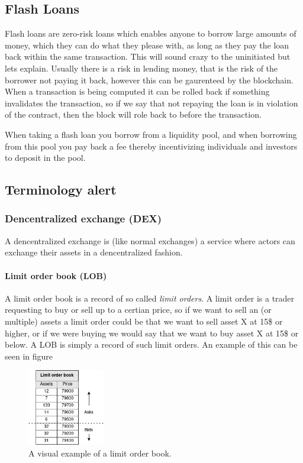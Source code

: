\subsection{Flash Loans}
Flash loans are zero-risk loans which enables anyone to borrow large amounts of money, which they can do what they please with, as long as they pay the loan back within the same transaction. This will sound crazy to the uninitiated but lets explain. Usually there is a risk in lending money, that is the risk of the borrower not paying it back, however this can be gaurenteed by the blockchain. When a transaction is being computed it can be rolled back if something invalidates the transaction, so if we say that not repaying the loan is in violation of the contract, then the block will role back to before the transaction.

When taking a flash loan you borrow from a liquidity pool, and when borrowing from this pool you pay back a fee thereby incentivizing individuals and investors to deposit in the pool.

\subsection{Terminology alert}
\subsubsection{Dencentralized exchange (DEX)}
A dencentralized exchange is (like normal exchanges) a service where actors can exchange their assets in a dencentralized fashion.

\paragraph{Limit order book (LOB)}
A limit order book is a record of so called \textit{limit orders}. A limit order is a trader requesting to buy or sell up to a certian price, so if we want to sell an (or multiple) assets a limit order could be that we want to sell asset X at 15\$ or higher, or if we were buying we would say that we want to buy asset X at 15\$ or below. A LOB is simply a record of such limit orders. An example of this can be seen in figure
\begin{figure}[h]
  \centering
  \includegraphics[width=0.3\textwidth]{assests/Flash-loans-LOB}
  \caption{A visual example of a limit order book.}
  \label{fig:LOB}
\end{figure}

